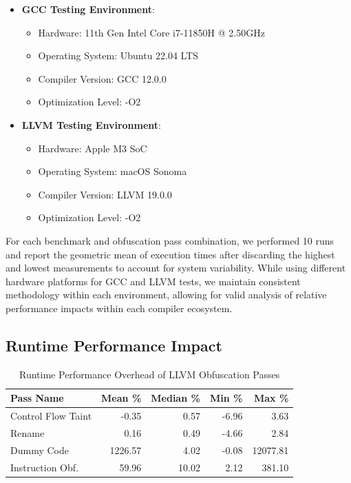 \documentclass[conference]{IEEEtran}
\begin{document}
\begin{itemize}
    \item \textbf{GCC Testing Environment}:
    \begin{itemize}
        \item Hardware: 11th Gen Intel Core i7-11850H @ 2.50GHz
        \item Operating System: Ubuntu 22.04 LTS
        \item Compiler Version: GCC 12.0.0
        \item Optimization Level: -O2
    \end{itemize}
    
    \item \textbf{LLVM Testing Environment}:
    \begin{itemize}
        \item Hardware: Apple M3 SoC
        \item Operating System: macOS Sonoma
        \item Compiler Version: LLVM 19.0.0
        \item Optimization Level: -O2
    \end{itemize}
\end{itemize}

For each benchmark and obfuscation pass combination, we performed 10 runs and report the geometric mean of execution times after discarding the highest and lowest measurements to account for system variability. While using different hardware platforms for GCC and LLVM tests, we maintain consistent methodology within each environment, allowing for valid analysis of relative performance impacts within each compiler ecosystem.

\subsection{Runtime Performance Impact}

\begin{table}[ht!]
\centering
\footnotesize
\caption{Runtime Performance Overhead of LLVM Obfuscation Passes}
\begin{tabular}{|l|r|r|r|r|}
\hline
\textbf{Pass Name} & \textbf{Mean \%} & \textbf{Median \%} & \textbf{Min \%} & \textbf{Max \%} \\
\hline
Control Flow Taint & -0.35 & 0.57 & -6.96 & 3.63 \\
Rename & 0.16 & 0.49 & -4.66 & 2.84 \\
Dummy Code & 1226.57 & 4.02 & -0.08 & 12077.81 \\
Instruction Obf. & 59.96 & 10.02 & 2.12 & 381.10 \\
\hline
\end{tabular}
\label{tab:llvm-runtime-overhead}
\end{table}
\end{document}
